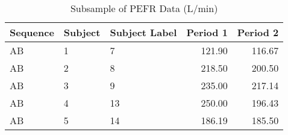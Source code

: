 \begin{table}

\caption{\label{tab:pefrDataSubsample}Subsample of PEFR Data (L/min)}
\centering
\begin{tabular}[t]{lllrr}
\toprule
Sequence & Subject & Subject Label & Period 1 & Period 2\\
\midrule
AB & 1 & 7 & 121.90 & 116.67\\
AB & 2 & 8 & 218.50 & 200.50\\
AB & 3 & 9 & 235.00 & 217.14\\
AB & 4 & 13 & 250.00 & 196.43\\
AB & 5 & 14 & 186.19 & 185.50\\
\bottomrule
\end{tabular}
\end{table}

